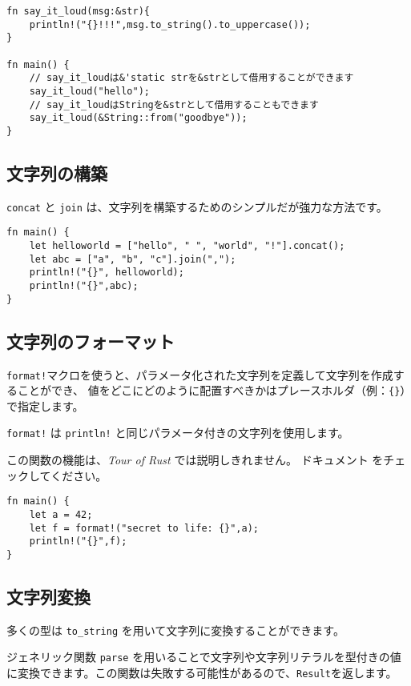\begin{verbatim}
fn say_it_loud(msg:&str){
    println!("{}!!!",msg.to_string().to_uppercase());
}

fn main() {
    // say_it_loudは&'static strを&strとして借用することができます
    say_it_loud("hello");
    // say_it_loudはStringを&strとして借用することもできます
    say_it_loud(&String::from("goodbye"));
}
\end{verbatim}

\subsection{文字列の構築}

\texttt{concat} と \texttt{join}
は、文字列を構築するためのシンプルだが強力な方法です。

\begin{verbatim}
fn main() {
    let helloworld = ["hello", " ", "world", "!"].concat();
    let abc = ["a", "b", "c"].join(",");
    println!("{}", helloworld);
    println!("{}",abc);
}
\end{verbatim}

\subsection{文字列のフォーマット}

\texttt{format!}マクロを使うと、パラメータ化された文字列を定義して文字列を作成することができ、
値をどこにどのように配置すべきかはプレースホルダ（例：\texttt{\{\}}）で指定します。

\texttt{format!} は \texttt{println!}
と同じパラメータ付きの文字列を使用します。

この関数の機能は、\emph{Tour of Rust} では説明しきれません。
ドキュメント をチェックしてください。

\begin{verbatim}
fn main() {
    let a = 42;
    let f = format!("secret to life: {}",a);
    println!("{}",f);
}
\end{verbatim}

\subsection{文字列変換}

多くの型は \texttt{to\_string} を用いて文字列に変換することができます。

ジェネリック関数 \texttt{parse}
を用いることで文字列や文字列リテラルを型付きの値に変換できます。この関数は失敗する可能性があるので、\texttt{Result}を返します。

